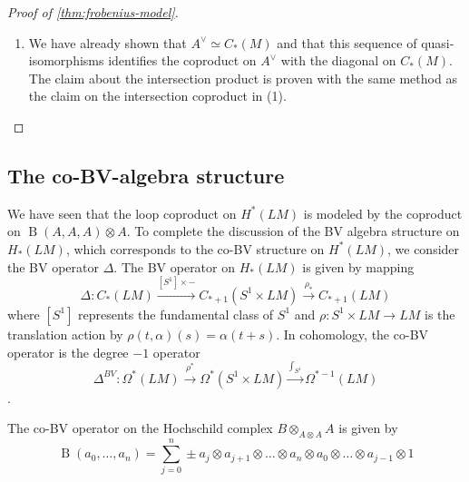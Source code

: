 \documentclass{scrartcl}
\theoremstyle{plain}
\newtheorem{proposition}[theorem]{Proposition}
\theoremstyle{definition}
\newtheorem{remark}[theorem]{Remark}
\newcommand{\APL}{A_{PL}}
\newcommand{\quiso}{\simeq}
\let\xto\xrightarrow
\let\xfrom\xleftarrow
\DeclareMathOperator{\BC}{B}
\newcommand{\blank}{-}
\begin{document}
\begin{proof}[Proof of \cref{thm:frobenius-model}]
\begin{enumerate}
    \item We have already shown that $A^{\vee} \quiso C_*(M)$ and that this sequence of quasi-isomorphisms identifies the coproduct on $A^{\vee}$ with the diagonal on $C_*(M)$. The claim about the intersection product is proven with the same method as the claim on the intersection coproduct in (1). 
    \end{enumerate}
\end{proof}



\subsection{The co-BV-algebra structure} \label{subsec:co-bv-alg}
We have seen that the loop coproduct on $H^*(LM)$ is modeled by the coproduct on $\BC(A, A, A)\otimes A$. To complete the discussion of the BV algebra structure on $H_*(LM)$, which corresponds to the co-BV structure on $H^*(LM)$, we consider the BV operator $\Delta$. The BV operator on $H_*(LM)$ is given by mapping $$\Delta\colon C_*(LM)\xto{[S^1]\times\blank} C_{*+1}(S^1\times LM)\xto{\rho_*} C_{*+1}(LM)$$
where $[S^1]$ represents the fundamental class of $S^1$ and $\rho\colon S^1\times LM\to LM$ is the translation action by $\rho(t, \alpha)(s) = \alpha(t+s)$. In cohomology, the co-BV operator is the degree $-1$ operator $$\Delta^{BV}\colon \Omega^*(LM) \xto{\rho^*} \Omega^*(S^1\times LM) \xto{\int_{S^1}} \Omega^{*-1}(LM)$$.

The co-BV operator on the Hochschild complex $B\otimes_{A\otimes A} A$ is given by $$\BC(a_0, \dots, a_n) = \sum_{j=0}^n \pm a_j\otimes  a_{j+1}\otimes  \dots\otimes  a_n\otimes  a_0\otimes  \dots \otimes a_{j-1} \otimes 1$$
\end{document}
